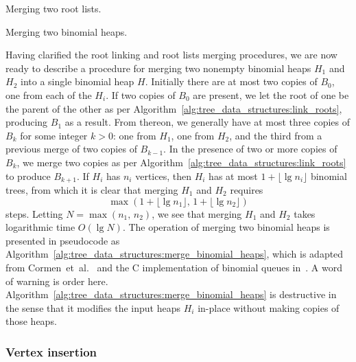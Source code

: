 \begin{algorithm}[!htbp]

\caption{Merging two root lists.}
\label{alg:tree_data_structures:merge_root_lists}
\end{algorithm}

\begin{algorithm}[!htbp]

\caption{Merging two binomial heaps.}
\label{alg:tree_data_structures:merge_binomial_heaps}
\end{algorithm}

Having clarified the root linking and root lists merging procedures,
we are now ready to describe a procedure for merging two nonempty
binomial heaps $H_1$ and $H_2$ into a single binomial heap
$H$. Initially there are at most two copies of $B_0$, one from each of
the $H_i$. If two copies of $B_0$ are present, we let the root of one
be the parent of the other as per
Algorithm~\ref{alg:tree_data_structures:link_roots}, producing $B_1$
as a result. From thereon, we generally have at most three copies of
$B_k$ for some integer $k > 0$: one from $H_1$, one from $H_2$, and
the third from a previous merge of two copies of $B_{k-1}$. In the
presence of two or more copies of $B_k$, we merge two copies as per
Algorithm~\ref{alg:tree_data_structures:link_roots} to produce
$B_{k+1}$. If $H_i$ has $n_i$ vertices, then $H_i$ has at most
$1 + \lfloor \lg n_i \rfloor$ binomial trees, from which it is clear
that merging $H_1$ and $H_2$ requires
\[
\max(1 + \lfloor \lg n_1 \rfloor,\, 1 + \lfloor \lg n_2 \rfloor)
\]
steps. Letting $N = \max(n_1,\, n_2)$, we see that merging $H_1$ and
$H_2$ takes logarithmic time $O(\lg N)$. The operation of merging two
binomial heaps is presented in pseudocode as
Algorithm~\ref{alg:tree_data_structures:merge_binomial_heaps}, which
is adapted from Cormen~et~al.~\cite[p.463]{CormenEtAl2001} and the C
implementation of binomial queues in~\cite{Howard2010}. A word of
warning is order here.
Algorithm~\ref{alg:tree_data_structures:merge_binomial_heaps} is
destructive in the sense that it modifies the input heaps $H_i$
in-place without making copies of those heaps.



\subsubsection{Vertex insertion}

